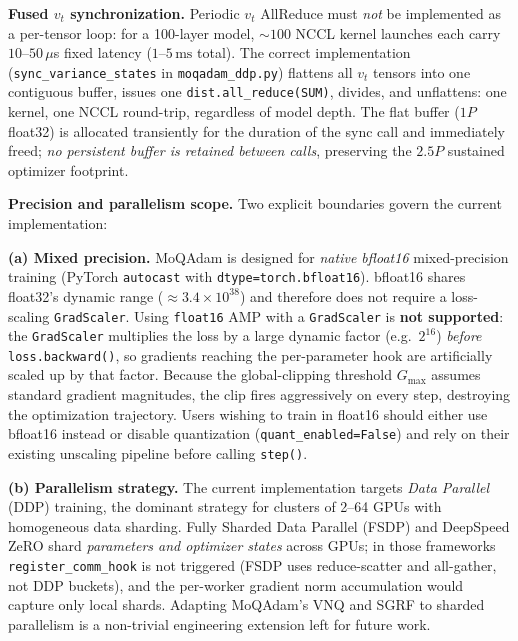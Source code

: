 \documentclass[10pt,twocolumn]{article}
\begin{document}
\textbf{Fused $v_t$ synchronization.}
Periodic $v_t$ AllReduce must \emph{not} be implemented as a per-tensor loop:
for a 100-layer model, ${\sim}100$ NCCL kernel launches each carry
$10$--$50\,\mu$s fixed latency ($1$--$5\,\text{ms}$ total).  The correct
implementation (\texttt{sync\_variance\_states} in \texttt{moqadam\_ddp.py})
flattens all $v_t$ tensors into one contiguous buffer, issues one
\texttt{dist.all\_reduce(SUM)}, divides, and unflattens: one kernel,
one NCCL round-trip, regardless of model depth.  The flat buffer ($1P$
float32) is allocated transiently for the duration of the sync call and
immediately freed; \emph{no persistent buffer is retained between calls},
preserving the $2.5P$ sustained optimizer footprint.

\textbf{Precision and parallelism scope.}
Two explicit boundaries govern the current implementation:

\textbf{(a) Mixed precision.}
MoQAdam is designed for \emph{native bfloat16} mixed-precision training
(PyTorch \texttt{autocast} with \texttt{dtype=torch.bfloat16}).  bfloat16
shares float32's dynamic range ($\approx 3.4\times10^{38}$) and therefore
does not require a loss-scaling \texttt{GradScaler}.  Using
\texttt{float16} AMP with a \texttt{GradScaler} is \textbf{not supported}:
the \texttt{GradScaler} multiplies the loss by a large dynamic factor
(e.g.\ $2^{16}$) \emph{before} \texttt{loss.backward()}, so gradients
reaching the per-parameter hook are artificially scaled up by that factor.
Because the global-clipping threshold $G_{\max}$ assumes standard gradient
magnitudes, the clip fires aggressively on every step, destroying the
optimization trajectory.  Users wishing to train in float16 should either
use bfloat16 instead or disable quantization (\texttt{quant\_enabled=False})
and rely on their existing unscaling pipeline before calling \texttt{step()}.

\textbf{(b) Parallelism strategy.}
The current implementation targets \emph{Data Parallel} (DDP) training,
the dominant strategy for clusters of 2--64 GPUs with homogeneous data
sharding.  Fully Sharded Data Parallel (FSDP) and DeepSpeed ZeRO shard
\emph{parameters and optimizer states} across GPUs; in those frameworks
\texttt{register\_comm\_hook} is not triggered (FSDP uses reduce-scatter
and all-gather, not DDP buckets), and the per-worker gradient norm
accumulation would capture only local shards.  Adapting MoQAdam's VNQ
and SGRF to sharded parallelism is a non-trivial engineering extension
left for future work.
\end{document}
